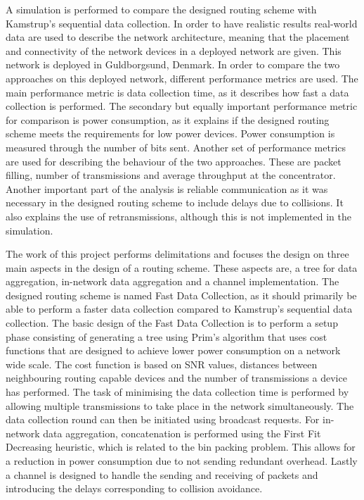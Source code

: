 A simulation is performed to compare the designed routing scheme with Kamstrup's sequential data collection. In order to have realistic results real-world data are used to describe the network architecture, meaning that the placement and connectivity of the network devices in a deployed network are given. This network is deployed in Guldborgsund, Denmark. In order to compare the two approaches on this deployed network, different performance metrics are used. The main performance metric is data collection time, as it describes how fast a data collection is performed. The secondary but equally important performance metric for comparison is power consumption, as it explains if the designed routing scheme meets the requirements for low power devices. Power consumption is measured through the number of bits sent. Another set of performance metrics are used for describing the behaviour of the two approaches. These are packet filling, number of transmissions and average throughput at the concentrator. Another important part of the analysis is reliable communication as it was necessary in the designed routing scheme to include delays due to collisions. It also explains the use of retransmissions, although this is not implemented in the simulation.

The work of this project performs delimitations and focuses the design on three main aspects in the design of a routing scheme. These aspects are, a tree for data aggregation, in-network data aggregation and a channel implementation. The designed routing scheme is named Fast Data Collection, as it should primarily be able to perform a faster data collection compared to Kamstrup's sequential data collection. The basic design of the Fast Data Collection is to perform a setup phase consisting of generating a tree using Prim's algorithm that uses cost functions that are designed to achieve lower power consumption on a network wide scale. The cost function is based on SNR values, distances between neighbouring routing capable devices and the number of transmissions a device has performed. The task of minimising the data collection time is performed by allowing multiple transmissions to take place in the network simultaneously. The data collection round can then be initiated using broadcast requests. For in-network data aggregation, concatenation is performed using the First Fit Decreasing heuristic, which is related to the bin packing problem. This allows for a reduction in power consumption due to not sending redundant overhead. Lastly a channel is designed to handle the sending and receiving of packets and introducing the delays corresponding to collision avoidance.

